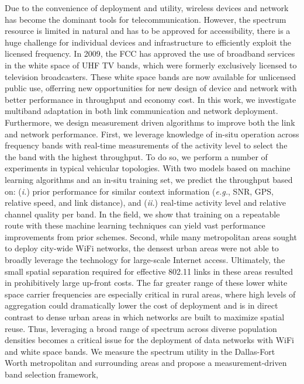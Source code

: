 Due to the convenience of deployment and utility, wireless devices and network
has become the dominant tools for telecommunication. However, the spectrum resource
is limited in natural and has to be approved for accessibility, there is a huge 
challenge for individual devices and infrastructure to efficiently exploit the 
licensed frequency. In 2009, the FCC has approved the use of broadband services 
in the white space of UHF TV bands, which were formerly exclusively licensed to 
television broadcasters. These white space bands are now available for unlicensed 
public use, offerring new opportunities for new design of device and network with 
better performance in throughput and economy cost. In this work, we investigate 
multiband adaptation in both link communication and network deployment. Furthermore, 
we design measurement driven algorithms to improve both the link and network 
performance.
First, we leverage knowledge of in-situ operation across frequency bands with 
real-time measurements of the activity level to select the the band with the 
highest throughput. To do so, we perform a number of experiments in typical 
vehicular topologies. With two models based on machine learning algorithms 
and an in-situ training set, we predict the throughput based on: ({\it i.}) 
prior performance for similar context information ({\it e.g.}, SNR, GPS, 
relative speed, and link distance), and ({\it ii.}) real-time activity level 
and relative channel quality per band. In the field, we show that training on 
a repeatable route with these machine learning techniques can yield vast 
performance improvements from prior schemes. 
Second, while many metropolitan areas sought to deploy city-wide WiFi networks, 
the densest urban areas were not able to broadly leverage the technology for 
large-scale Internet access.  Ultimately, the small spatial separation required 
for effective 802.11 links in these areas resulted in prohibitively large up-front 
costs. The far greater range of these lower white space carrier frequencies are 
especially critical in rural areas, where high levels of aggregation could 
dramatically lower the cost of deployment and is in direct contrast to dense 
urban areas in which networks are built to maximize spatial reuse.  Thus, 
leveraging a broad range of spectrum across diverse population densities 
becomes a critical issue for the deployment of data networks with WiFi and white 
space bands. We measure the spectrum utility in the Dallas-Fort Worth metropolitan 
and surrounding areas and propose a measurement-driven band selection framework, 
